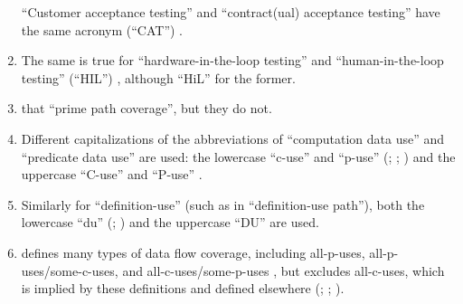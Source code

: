 \begin{enumerate}
          ``Customer acceptance testing'' and ``contract(ual) acceptance
          testing'' have the same acronym (``CAT'') \citep[p.~30]{Firesmith2015}.
    \item %
          The same is true for ``hardware-in-the-loop testing'' and
          ``human-in-the-loop testing'' (``HIL'') \citep[p.~23]{Firesmith2015},
          although \citet[p.~2] {PreußeEtAl2012}  ``HiL''
          for the former.
    \item %
          \citet[p.~184]{DoğanEtAl2014}  that
          \citet{SakamotoEtAl2013}  ``prime path
          coverage'', but they do not.

    \item %
          Different capitalizations of the abbreviations of ``computation data
          use'' and ``predicate data use'' are used: the lowercase ``\acs{c-use}''
          and ``\acs{p-use}'' (\citealp[pp.~3, 27-29, 35-36, 114-155, 117-118,
              129]{IEEE2021}; \citeyear[p.~124]{IEEE2017};
          \citealp[p.~477, Tab.~12.6]{PetersAndPedrycz2000}) and the uppercase
          ``C-use'' and ``P-use'' \citep[pp.~424-425]{vanVliet2000}.
    \item %
          Similarly for ``definition-use'' (such as in ``definition-use
          path''), both the lowercase ``du'' (\citealp[pp.~3, 27, 29, 35,
              119-121, 129]{IEEE2021}; \citealp[pp.~478-479]{
              PetersAndPedrycz2000}) and the uppercase ``DU''
          \citep[p.~425]{vanVliet2000} are used.
    \item %
           {} defines many types of data flow
          coverage, including all-\acsp{p-use}, all-\acsp{p-use}/some-\acsp{c-use}, and
          all-\acsp{c-use}/some-\acsp{p-use} \citeyearpar[p.~425]{vanVliet2000}, but
          excludes all-\acsp{c-use}, which is implied by these definitions and
          defined elsewhere (\citealp[p.~27]{IEEE2021};
          \citeyear[p.~83]{IEEE2017}; \citealp[p.~479]{PetersAndPedrycz2000}).

\end{enumerate}
